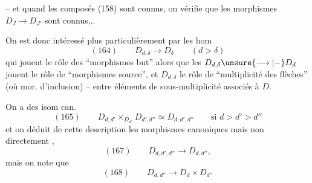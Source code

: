 -- et quand les composés (158) sont connus, on vérifie que les morphismes $D_J\longrightarrow D_{J'}$ sont connus,..

On est donc intéressé plus particulièrement par les hom
\[
(164)\qquad D_{d,\delta}\longrightarrow D_\delta\qquad(d>\delta)
\]
qui jouent le rôle des ``morphismes but'' alors que les $D_{d,\delta}\unsure{\longrightarrow|-}D_d$ jouent le rôle de ``morphismes source'', et $D_{d,\delta}$ le rôle de ``multiplicité des flèches'' (où mor. d'inclusion) -- entre éléments de sous-multiplicité  associés à $D$.

On a des isom can.
\[
(165)\qquad D_{d,d'}\times_{D_{d'}}D_{d',d''}\simeq D_{d,d',d''}\qquad\text{si }d>d'>d''
\]
et on  déduit de cette description les morphismes canoniques
mais non directement ,
\[
(167)\qquad D_{d,d',d''}\longrightarrow D_{d,d''},
\]
mais on note que
\[
(168)\qquad D_{d,d''}\longrightarrow D_d\times D_{d''}
\]

